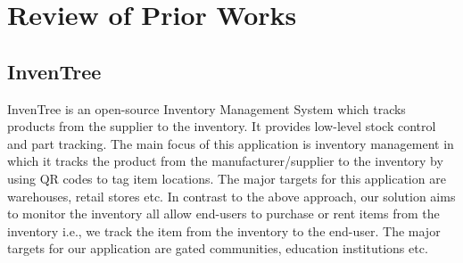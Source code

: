 \chapter{Review of Prior Works}
\section{InvenTree}
InvenTree is an open-source Inventory Management System which tracks products from the supplier to the inventory. It provides low-level stock control and part tracking. The main focus of this application is inventory management in which it tracks the product from the manufacturer/supplier to the inventory by using QR codes to tag item locations. The major targets for this application are warehouses, retail stores etc.
In contrast to the above approach, our solution aims to monitor the inventory all allow end-users to purchase or rent items from the inventory i.e., we track the item from the inventory to the end-user. The major targets for our application are gated communities, education institutions etc.



